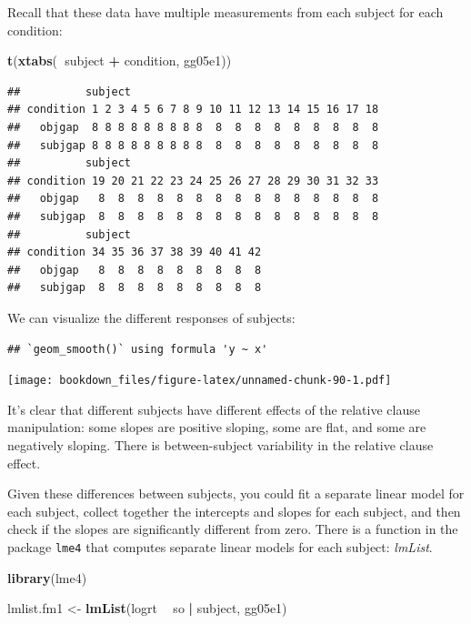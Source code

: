 \documentclass[12pt,]{krantz}
\newenvironment{Shaded}{\begin{snugshade}}{\end{snugshade}}
\newcommand{\KeywordTok}[1]{\textcolor[rgb]{0.13,0.29,0.53}{\textbf{#1}}}
\newcommand{\NormalTok}[1]{#1}
\newcommand{\OperatorTok}[1]{\textcolor[rgb]{0.81,0.36,0.00}{\textbf{#1}}}
\newcommand{\StringTok}[1]{\textcolor[rgb]{0.31,0.60,0.02}{#1}}
\begin{document}
Recall that these data have multiple measurements from each subject for each condition:

\begin{Shaded}
\begin{Highlighting}[]
\KeywordTok{t}\NormalTok{(}\KeywordTok{xtabs}\NormalTok{(}\OperatorTok{~}\NormalTok{subject }\OperatorTok{+}\StringTok{ }\NormalTok{condition, gg05e1))}
\end{Highlighting}
\end{Shaded}

\begin{verbatim}
##          subject
## condition 1 2 3 4 5 6 7 8 9 10 11 12 13 14 15 16 17 18
##   objgap  8 8 8 8 8 8 8 8 8  8  8  8  8  8  8  8  8  8
##   subjgap 8 8 8 8 8 8 8 8 8  8  8  8  8  8  8  8  8  8
##          subject
## condition 19 20 21 22 23 24 25 26 27 28 29 30 31 32 33
##   objgap   8  8  8  8  8  8  8  8  8  8  8  8  8  8  8
##   subjgap  8  8  8  8  8  8  8  8  8  8  8  8  8  8  8
##          subject
## condition 34 35 36 37 38 39 40 41 42
##   objgap   8  8  8  8  8  8  8  8  8
##   subjgap  8  8  8  8  8  8  8  8  8
\end{verbatim}

We can visualize the different responses of subjects:

\begin{verbatim}
## `geom_smooth()` using formula 'y ~ x'
\end{verbatim}

\texttt{[image: bookdown\_files/figure-latex/unnamed-chunk-90-1.pdf]}

It's clear that different subjects have different effects of the relative clause manipulation: some slopes are positive sloping, some are flat, and some are negatively sloping. There is between-subject variability in the relative clause effect.

Given these differences between subjects, you could fit a separate linear model for each subject, collect together the intercepts and slopes for each subject, and then check if the slopes are significantly different from zero. There is a function in the package \texttt{lme4} that computes separate linear models for each subject: \emph{lmList}.

\begin{Shaded}
\begin{Highlighting}[]
\KeywordTok{library}\NormalTok{(lme4)}

\NormalTok{lmlist.fm1 <-}\StringTok{ }\KeywordTok{lmList}\NormalTok{(logrt }\OperatorTok{~}\StringTok{ }\NormalTok{so }\OperatorTok{|}\StringTok{ }\NormalTok{subject, }
\NormalTok{  gg05e1)}
\end{Highlighting}
\end{Shaded}
\end{document}
